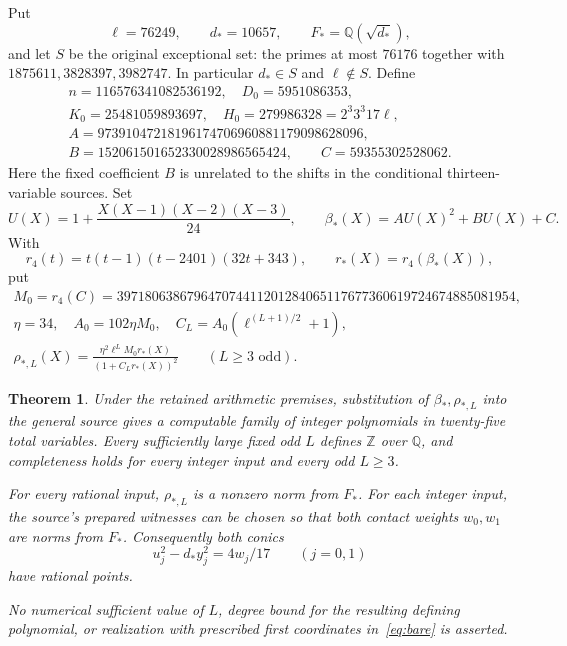 \documentclass[11pt,a4paper]{article}
\newtheorem{theorem}{Theorem}[section]
\newcommand{\Q}{\mathbb Q}\newcommand{\Z}{\mathbb Z}
\begin{document}
Put
\[
 \ell=76249,\qquad d_*=10657,\qquad F_* =\Q(\sqrt{d_*}),
\]
and let $S$ be the original exceptional set: the primes at most $76176$
together with $1875611,3828397,3982747$. In particular $d_*\in S$
and $\ell\notin S$. Define
\begin{equation}\label{eq:constants}
\begin{gathered}
 n=116576341082536192,\quad D_0=5951086353,\\
 K_0=25481059893697,\quad H_0=279986328=2^3 3^3 17\ell,\\
 A=97391047218196174706960881179098628096,\\
 B=152061501652330028986565424,\qquad C=59355302528062.
\end{gathered}
\end{equation}
Here the fixed coefficient $B$ is unrelated to the shifts in the
conditional thirteen-variable sources. Set
\begin{equation}\label{eq:input}
 U(X)=1+\frac{X(X-1)(X-2)(X-3)}{24},\qquad
 \beta_*(X)=AU(X)^2+BU(X)+C.
\end{equation}
With
\[
 r_4(t)=t(t-1)(t-2401)(32t+343),\qquad r_*(X)=r_4(\beta_*(X)),
\]
put
\begin{equation}\label{eq:scalar}
\begin{gathered}
 M_0=r_4(C)
 =397180638679647074411201284065117677360619724674885081954,\\
 \eta=34,\quad A_0=102\eta M_0,\quad
 C_L=A_0(\ell^{(L+1)/2}+1),\\
 \rho_{*,L}(X)=
 \frac{\eta^2\ell^L M_0r_*(X)}{(1+C_Lr_*(X))^2}
 \qquad(L\ge3\text{ odd}).
\end{gathered}
\end{equation}

\begin{theorem}\label{thm:main}
Under the retained arithmetic premises, substitution of
$\beta_*,\rho_{*,L}$ into the general source gives a computable family
of integer polynomials in twenty-five total variables. Every sufficiently
large fixed odd $L$ defines $\Z$ over $\Q$, and completeness holds for
every integer input and every odd $L\ge3$.

For every rational input, $\rho_{*,L}$ is a nonzero norm from $F_*$.
For each integer input, the source's prepared witnesses can be chosen so
that both contact weights $w_0,w_1$ are norms from $F_*$. Consequently
both conics
\begin{equation}\label{eq:bare}
                 u_j^2-d_*y_j^2=4w_j/17\qquad(j=0,1)
\end{equation}
have rational points.

No numerical sufficient value of $L$, degree bound for the resulting
defining polynomial, or realization with prescribed first coordinates
in~\eqref{eq:bare} is asserted.
\end{theorem}
\end{document}
